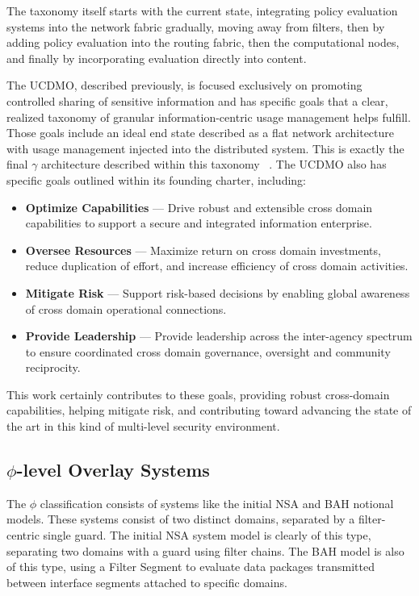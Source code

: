 The taxonomy itself starts with the current state, integrating policy evaluation systems into the network fabric gradually, moving away from filters, then by adding policy evaluation into the routing fabric, then the computational nodes, and finally by incorporating evaluation directly into content.

The UCDMO, described previously, is focused exclusively on promoting controlled sharing of sensitive information and has specific goals that a clear, realized taxonomy of granular information-centric usage management helps fulfill.  Those goals include an ideal end state described as a flat network architecture with usage management injected into the distributed system.  This is exactly the final $\gamma$ architecture described within this taxonomy ~\cite{proposal:cd101,proposal:ucdmo-goals}.  The UCDMO also has specific goals outlined within its founding charter, including:

\begin{itemize}
\item \textbf{Optimize Capabilities} ---  Drive robust and extensible cross domain capabilities to support a secure and integrated information enterprise.
\item \textbf{Oversee Resources} ---  Maximize return on cross domain investments, reduce duplication of effort, and increase efficiency of cross domain activities.
\item \textbf{Mitigate Risk} ---  Support risk-based decisions by enabling global awareness of cross domain operational connections.
\item \textbf{Provide Leadership} ---  Provide leadership across the inter-agency spectrum to ensure coordinated cross domain governance, oversight and community reciprocity.
\end{itemize}

This work certainly contributes to these goals, providing robust cross-domain capabilities, helping mitigate risk, and contributing toward advancing the state of the art in this kind of multi-level security environment.

\subsection{$\phi$-level Overlay Systems}
The $\phi$ classification consists of systems like the initial NSA and BAH notional models.  These systems consist of two distinct domains, separated by a filter-centric single guard.  The initial NSA system model is clearly of this type, separating two domains with a guard using filter chains.  The BAH model is also of this type, using a Filter Segment to evaluate data packages transmitted between interface segments attached to specific domains.


